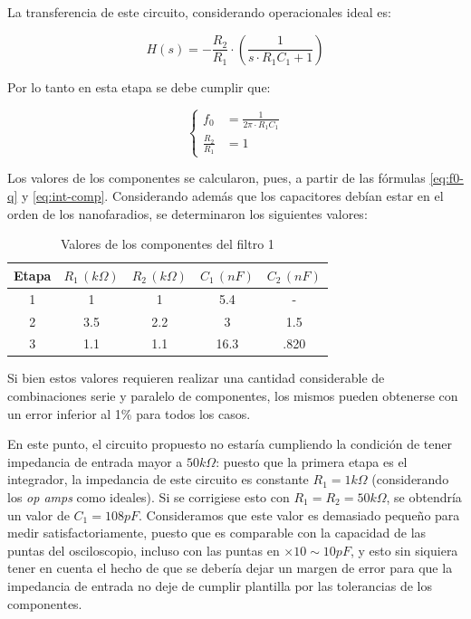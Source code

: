 \documentclass[../../tc_tp5_main.tex]{subfiles}
\begin{document}
La transferencia de este circuito, considerando operacionales ideal es:

\begin{equation}
	H(s) = - \frac{R_2}{R_1} \cdot \left(\frac{1}{s \cdot R_1 C_1 + 1}\right)
\end{equation}

Por lo tanto en esta etapa se debe cumplir que:

\begin{equation}
	\left\{
 	\begin{aligned}
 		f_0 &= \frac{1}{2\pi \cdot R_1 C_1} \\
 		\frac{R_2}{R_1} &= 1
	\end{aligned}
	\right.
	\label{eq:int-comp}
\end{equation}

Los valores de los componentes se calcularon, pues, a partir de las f\'ormulas \ref{eq:f0-q} y \ref{eq:int-comp}. Considerando adem\'as que los capacitores deb\'ian estar en el orden de los nanofaradios, se determinaron los siguientes valores:

\begin{table}[H]
	\centering
	\begin{tabular}{|c||c|c|c|c|}
	\hline
	Etapa & $R_1\, (k\Omega)$ & $R_2\, (k\Omega)$ & $C_1\, (nF)$ & $C_2\, (nF)$ \\ \hline \hline
	1     & 1                 & 1                 & 5.4          & -            \\ \hline
	2     & 3.5               & 2.2               & 3            & 1.5          \\ \hline
	3     & 1.1               & 1.1               & 16.3         & .820         \\ \hline
	\end{tabular}
	\caption{Valores de los componentes del filtro 1}
\end{table}

Si bien estos valores requieren realizar una cantidad considerable de combinaciones serie y paralelo de componentes, los mismos pueden obtenerse con un error inferior al 1\% para todos los casos.\par 

En este punto, el circuito propuesto no estar\'ia cumpliendo la condici\'on de tener impedancia de entrada mayor a $50k\Omega$: puesto que la primera etapa es el integrador, la impedancia de este circuito es constante $R_1 = 1k\Omega$ (considerando los \textit{op amps} como ideales). Si se corrigiese esto con $R_1 = R_2 = 50k\Omega$, se obtendr\'ia un valor de $C_1 = 108pF$. Consideramos que este valor es demasiado peque\~no para medir satisfactoriamente, puesto que es comparable con la capacidad de las puntas del osciloscopio, incluso con las puntas en $\times 10 \sim 10pF$, y esto sin siquiera tener en cuenta el hecho de que se deber\'ia dejar un margen de error para que la impedancia de entrada no deje de cumplir plantilla por las tolerancias de los componentes.\par
\end{document}
